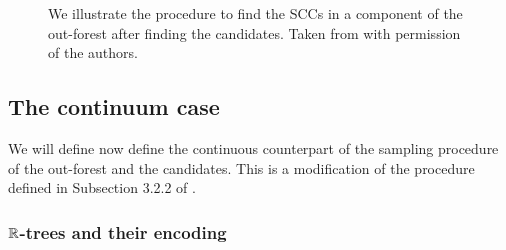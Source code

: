 \begin{figure}
\caption{We illustrate the procedure to find the SCCs in a component of the out-forest after finding the candidates. Taken from \cite{goldschmidtScalingLimitCritical2019} with permission of the authors.}
\end{figure}

\subsection{The continuum case}\label{subsec.limitobject}

We will define now define the continuous counterpart of the sampling procedure of the out-forest and the candidates. This is a modification of the procedure defined in Subsection 3.2.2 of \cite{goldschmidtScalingLimitCritical2019}.

\subsubsection{\texorpdfstring{${\mathbb R}$}{R}-trees and their encoding}


